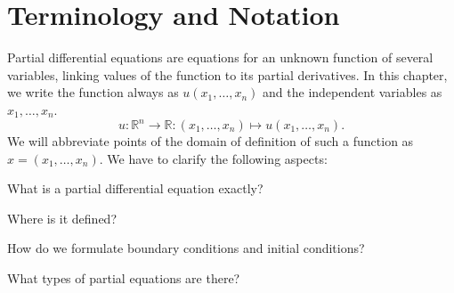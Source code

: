 %
% 
%
\chapter{Terminology and Notation
\label{chapter:terminology and notation}}
Partial differential equations are equations for an unknown function of
several variables, linking values of the function to its partial
derivatives.
In this chapter, we write the function always as $u(x_1,\dots,x_n)$
and the independent variables as $x_1,\dots,x_n$.
\[
u\colon \mathbb R^n\to\mathbb R:(x_1,\dots,x_n)\mapsto u(x_1,\dots,x_n).
\]
We will abbreviate points of the domain of definition of such a function
as $x=(x_1,\dots,x_n)$.
We have to clarify the following aspects:
\begin{compactenum}
\item What is a partial differential equation exactly?
\item Where is it defined?
\item How do we formulate boundary conditions and initial conditions?
\item What types of partial equations are there?
\end{compactenum}








